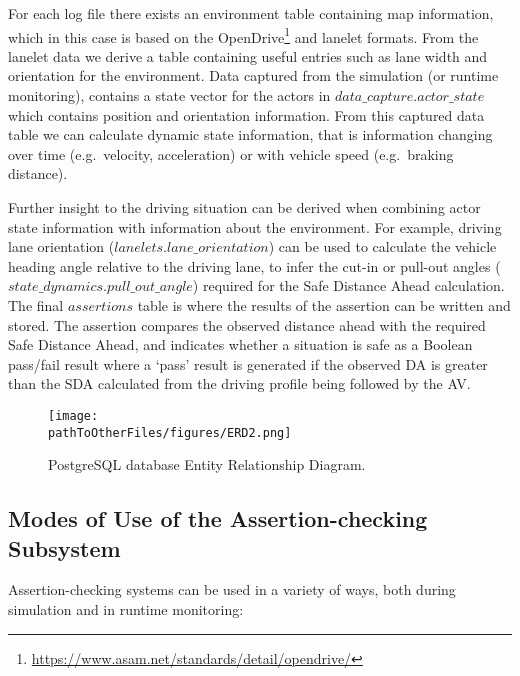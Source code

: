For each log file there exists an environment table containing map information, which in this case is based on the OpenDrive\footnote{\url{https://www.asam.net/standards/detail/opendrive/}} and lanelet formats. From the lanelet data we derive a table containing useful entries such as lane width and orientation for the environment. Data captured from the simulation (or runtime monitoring), contains a state vector for the actors in $data\_capture.actor\_state$ which contains position and orientation information. From this captured data table we can calculate dynamic state information, that is information changing over time (e.g.\ velocity, acceleration) or with vehicle speed (e.g.\ braking distance). 

Further insight to the driving situation can be derived when combining actor state information with information about the environment. For example, driving lane orientation ($lanelets.lane\_orientation$) can be used to calculate the vehicle heading angle relative to the driving lane, to infer the cut-in or pull-out angles ($state\_dynamics.pull\_out\_angle$) required for the Safe Distance Ahead calculation. The final $assertions$ table is where the results of the assertion can be written and stored. The assertion compares the observed distance ahead with the required Safe Distance Ahead, and indicates whether a situation is safe as a Boolean pass/fail result where a `pass' result is generated if the observed DA is greater than the SDA calculated from the driving profile being followed by the AV.


\begin{figure}
    \centering
    \texttt{[image: \\pathToOtherFiles/figures/ERD2.png]}
    \caption{PostgreSQL database Entity Relationship Diagram.}
    \label{fig:erd}
\end{figure}




\subsection{Modes of Use of the Assertion-checking Subsystem} \label{Assertions_at_Sim_Time} \label{assertions_at_run_time}

Assertion-checking systems can be used %
in a variety of ways, both during simulation and in runtime monitoring:

